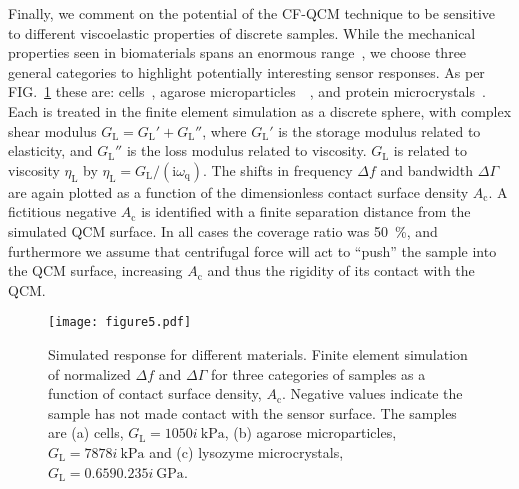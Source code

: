 \documentclass[floatfix,superscriptaddress,a4paper,twocolumn]{revtex4-1}
\newcommand{\Figure}[1]{FIG.~\ref{#1}}
\newcommand{\mi}{{\mathrm{i}}}
\newcommand{\df}{\Delta\!f}
\newcommand{\dg}{\Delta\Gamma}
\newcommand{\omegaq}{\omega_\mathrm{q}}
\begin{document}
Finally, we comment on the potential of the CF-QCM technique to be
sensitive to different viscoelastic properties of discrete samples.  While
the mechanical properties seen in biomaterials spans an enormous
range~\cite{meyers2008biological}, we choose three general categories to
highlight potentially interesting sensor responses.  As per
\Figure{fig:multisweep} these are: cells~\cite{li2008thickness}, agarose
microparticles~\cite{li2011surface}~\cite{patra2009viscoelastic}, and
protein microcrystals~\cite{zamiri2009modeling}.  Each is treated in the
finite element simulation as a discrete sphere, with complex shear modulus
$G_\mathrm{L}=G_\mathrm{L}'+G_\mathrm{L}''$, where $G_\mathrm{L}'$ is the
storage modulus related to elasticity, and $G_\mathrm{L}''$ is the loss
modulus related to viscosity.  $G_\mathrm{L}$ is related to viscosity
$\eta_\mathrm{L}$ by $\eta_\mathrm{L}=G_\mathrm{L}/(\mi\omegaq)$.  The
shifts in frequency $\df$ and bandwidth $\dg$ are again plotted as a function of
the dimensionless contact surface density $A_\mathrm{c}$.
A fictitious negative $A_\mathrm{c}$
is identified with a finite separation distance from the
simulated QCM surface.  In all cases the coverage ratio was
\SI{50}{\percent}, and furthermore we assume that centrifugal force will act to
``push'' the sample into the QCM surface, increasing $A_\mathrm{c}$ and
thus the rigidity of its contact with the QCM.
\begin{figure}[ht]
 \centering
\texttt{[image: figure5.pdf]}
\caption{Simulated response for different materials.  Finite element simulation of normalized $\df$ and $\dg$ for three
 categories of samples as a function of contact surface density,
 $A_\mathrm{c}$.
 Negative values indicate the sample has not made contact with the sensor
 surface.
 The samples are (a) cells, $G_\mathrm{L}=\SI{10+50i}{\kilo\pascal}$, (b)
 agarose microparticles, $G_\mathrm{L}=\SI{78+78i}{\kilo\pascal}$ and (c) lysozyme
 microcrystals, $G_\mathrm{L}=\SI{0.659+0.235i}{\giga\pascal}$.  }
\label{fig:multisweep}
\end{figure}
\end{document}

